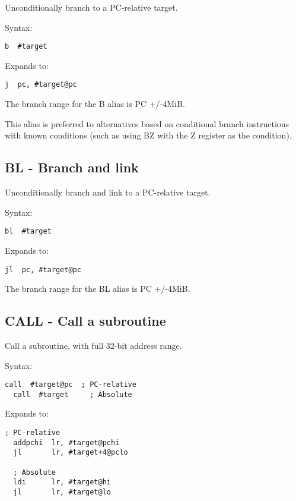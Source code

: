 Unconditionally branch to a PC-relative target.

Syntax:
\begin{lstlisting}[style=assembler]
  b  #target
\end{lstlisting}

Expands to:
\begin{lstlisting}[style=assembler]
  j  pc, #target@pc
\end{lstlisting}

\begin{notebox}
The branch range for the B alias is PC +/-4MiB.

This alias is preferred to alternatives based on conditional branch
instructions with known conditions (such as using BZ with the Z register as the
condition).
\end{notebox}

\subsection{BL - Branch and link}

Unconditionally branch and link to a PC-relative target.

Syntax:
\begin{lstlisting}[style=assembler]
  bl  #target
\end{lstlisting}

Expands to:
\begin{lstlisting}[style=assembler]
  jl  pc, #target@pc
\end{lstlisting}

\begin{notebox}
The branch range for the BL alias is PC +/-4MiB.
\end{notebox}

\subsection{CALL - Call a subroutine}

Call a subroutine, with full 32-bit address range.

Syntax:
\begin{lstlisting}[style=assembler]
  call  #target@pc  ; PC-relative
  call  #target     ; Absolute
\end{lstlisting}

Expands to:
\begin{lstlisting}[style=assembler]
  ; PC-relative
  addpchi  lr, #target@pchi
  jl       lr, #target+4@pclo

  ; Absolute
  ldi      lr, #target@hi
  jl       lr, #target@lo
\end{lstlisting}

